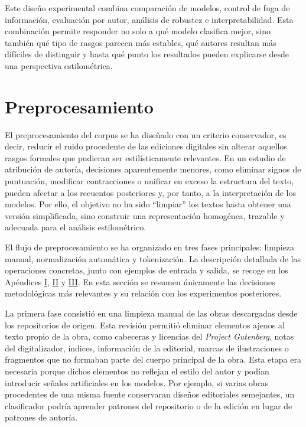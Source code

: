 \documentclass[IB]{TFUOC}%
\begin{document}
Este diseño experimental combina comparación de modelos, control de fuga de información, evaluación por autor, análisis de robustez e interpretabilidad. Esta combinación permite responder no solo a qué modelo clasifica mejor, sino también qué tipo de rasgos parecen más estables, qué autores resultan más difíciles de distinguir y hasta qué punto los resultados pueden explicarse desde una perspectiva estilométrica.

\section{Preprocesamiento}

El preprocesamiento del corpus se ha diseñado con un criterio conservador, es decir, reducir el ruido procedente de las ediciones digitales sin alterar aquellos rasgos formales que pudieran ser estilísticamente relevantes. En un estudio de atribución de autoría, decisiones aparentemente menores, como eliminar signos de puntuación, modificar contracciones o unificar en exceso la estructura del texto, pueden afectar a los recuentos posteriores y, por tanto, a la interpretación de los modelos. Por ello, el objetivo no ha sido ``limpiar'' los textos hasta obtener una versión  simplificada, sino construir una representación homogénea, trazable y adecuada para el análisis estilométrico.

El flujo de preprocesamiento se ha organizado en tres fases principales: limpieza manual, normalización automática y tokenización. La descripción detallada de las operaciones concretas, junto con ejemplos de entrada y salida, se recoge en los Apéndices \hyperref[apx:limpieza-manual]{I}, \hyperref[apx:normalizacion]{II} y \hyperref[apx:tokenizacion]{III}. En esta sección se resumen únicamente las decisiones metodológicas más relevantes y su relación con los experimentos posteriores.

La primera fase consistió en una limpieza manual de las obras descargadas desde los repositorios de origen. Esta revisión permitió eliminar elementos ajenos al texto propio de la obra, como cabeceras y licencias del \textit{Project Gutenberg}, notas del digitalizador, índices, información de la editorial, marcas de ilustraciones o fragmentos que no formaban parte del cuerpo principal de la obra. Esta etapa era necesaria porque dichos elementos no reflejan el estilo del autor y podían introducir señales artificiales en los modelos. Por ejemplo, si varias obras procedentes de una misma fuente conservaran diseños editoriales semejantes, un clasificador podría aprender patrones del repositorio o de la edición en lugar de patrones de autoría.
\end{document}
